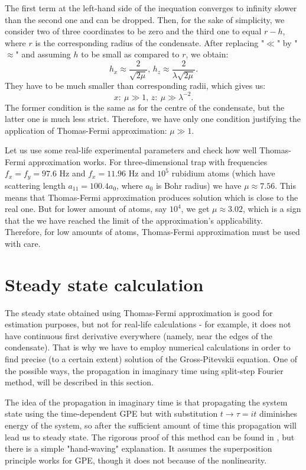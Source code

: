 \documentclass[12pt,notitlepage]{report}
\begin{document}
The first term at the left-hand side of the inequation converges to infinity slower than the second one and can be dropped. Then, for the sake of simplicity, we consider two of three coordinates to be zero and the third one to equal $r - h$, where $r$ is the corresponding radius of the condensate. After replacing "$\ll$" by "$\approx$" and assuming $h$ to be small as compared to $r$, we obtain:
\[ h_x \approx \frac{2}{\sqrt{2 \mu}},\, h_z \approx \frac{2}{\lambda \sqrt{2 \mu}}. \]
They have to be much smaller than corresponding radii, which gives us:
\[ x:\: \mu \gg 1,\, z:\: \mu \gg \lambda^{-2}. \]
The former condition is the same as for the centre of the condensate, but the latter one is much less strict. Therefore, we have only one condition justifying the application of Thomas-Fermi approximation: $\mu \gg 1$.
 
Let us use some real-life experimental parameters and check how well Thomas-Fermi approximation works. For three-dimensional trap with frequencies $f_x = f_y = 97.6 \textrm{ Hz}$ and $f_x = 11.96 \textrm{ Hz}$ and $10^5$ rubidium atoms (which have scattering length $a_{11} = 100.4 a_0$, where $a_0$ is Bohr radius) we have $\mu \approx 7.56$. This means that Thomas-Fermi approximation produces solution which is close to the real one. But for lower amount of atoms, say $10^4$, we get $\mu \approx 3.02$, which is a sign that the we have reached the limit of the approximation's applicability. Therefore, for low amounts of atoms, Thomas-Fermi approximation must be used with care.

\section*{Steady state calculation}

The steady state obtained using Thomas-Fermi approximation is good for estimation purposes, but not for real-life calculations - for example, it does not have continuous first derivative everywhere (namely, near the edges of the condensate). That is why we have to employ numerical calculations in order to find precise (to a certain extent) solution of the Gross-Pitevskii equation. One of the possible ways, the propagation in imaginary time using split-step Fourier method, will be described in this section.

The idea of the propagation in imaginary time is that propagating the system state using the time-dependent GPE but with substitution $t \rightarrow \tau = it$ diminishes energy of the system, so after the sufficient amount of time this propagation will lead us to steady state. The rigorous proof of this method can be found in \cite{gpe_ngf}, but there is a simple "hand-waving" explanation. It assumes the superposition principle works for GPE, though it does not because of the nonlinearity.
\end{document}
